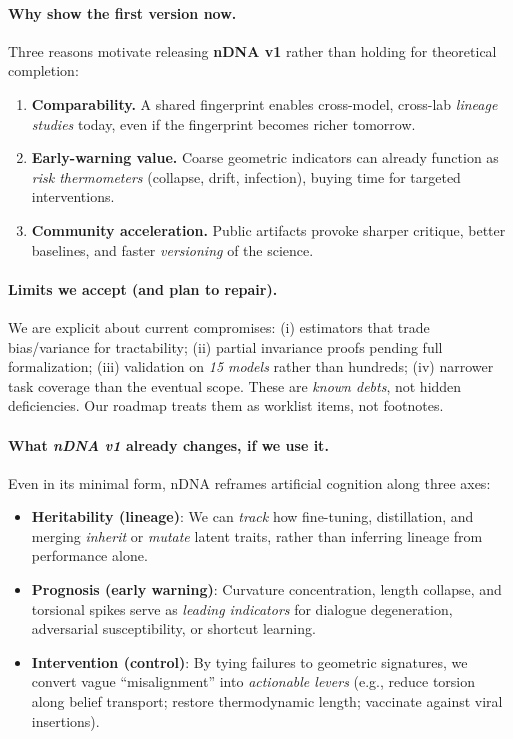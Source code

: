 \documentclass[11pt]{article}
\begin{document}
\paragraph{Why show the first version now.}
Three reasons motivate releasing \textbf{nDNA v1} rather than holding for theoretical completion:
\begin{enumerate}
  \item \textbf{Comparability.} A shared fingerprint enables cross-model, cross-lab \emph{lineage studies} today, even if the fingerprint becomes richer tomorrow.
  \item \textbf{Early-warning value.} Coarse geometric indicators can already function as \emph{risk thermometers} (collapse, drift, infection), buying time for targeted interventions.
  \item \textbf{Community acceleration.} Public artifacts provoke sharper critique, better baselines, and faster \emph{versioning} of the science.
\end{enumerate}

\paragraph{Limits we accept (and plan to repair).}
We are explicit about current compromises: (i) estimators that trade bias/variance for tractability; (ii) partial invariance proofs pending full formalization; (iii) validation on \emph{15 models} rather than hundreds; (iv) narrower task coverage than the eventual scope. These are \emph{known debts}, not hidden deficiencies. Our roadmap treats them as worklist items, not footnotes.

\paragraph{What \emph{nDNA v1} already changes, if we use it.}
Even in its minimal form, nDNA reframes artificial cognition along three axes:
\begin{itemize}
  \item \textbf{Heritability (lineage)}: We can \emph{track} how fine-tuning, distillation, and merging \emph{inherit} or \emph{mutate} latent traits, rather than inferring lineage from performance alone.
  \item \textbf{Prognosis (early warning)}: Curvature concentration, length collapse, and torsional spikes serve as \emph{leading indicators} for dialogue degeneration, adversarial susceptibility, or shortcut learning.
  \item \textbf{Intervention (control)}: By tying failures to geometric signatures, we convert vague “misalignment” into \emph{actionable levers} (e.g., reduce torsion along belief transport; restore thermodynamic length; vaccinate against viral insertions).
\end{itemize}
\end{document}
